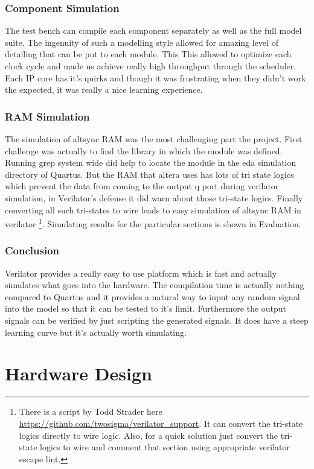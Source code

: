 \documentclass[twoside,12pt,fleqn]{book} %
\begin{document}
\subsection{Component Simulation} The test bench can compile each component separately as well as the full model suite. The ingenuity of such a modelling style allowed for amazing level of detailing that can be put to each module. This This allowed to optimize each clock cycle and made us achieve really high throughput through the scheduler. Each IP core has it's quirks and though it was frustrating when they didn't work the expected, it was really a nice learning experience.

\subsection{RAM Simulation} The simulation of altsync RAM was the most challenging part the project. First challenge was actually to find the library in which the module was defined. Running grep system wide did help to locate the module in the eda simulation directory of Quartus. But the RAM that altera uses has lots of tri state logics which prevent the data from coming to the output q port during verilator simulation, in Verilator's defense it did warn about those tri-state logics. Finally converting all such tri-states to wire leads to easy simulation of altsync RAM in verilator \footnote{There is a script by Todd Strader here \url{https://github.com/twosigma/verilator_support}. It can convert the tri-state logics directly to wire logic. Also, for a quick solution just convert the tri-state logics to wire and comment that section using appropriate verilator escape lint.}. Simulating results for the particular sections is shown in Evaluation.

\subsection{Conclusion} Verilator provides a really easy to use platform which is fast and actually simulates what goes into the hardware. The compilation time is actually nothing compared to Quartus and it provides a natural way to input any random signal into the model so that it can be tested to it's limit. Furthermore the output signals can be verified by just scripting the generated signals. It does have a steep learning curve but it's actually worth simulating.

\chapter{Hardware Design}
\end{document}
